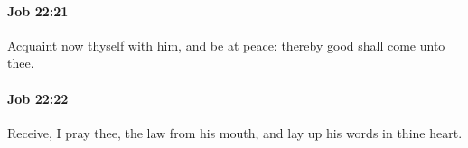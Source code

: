 		\paragraph{Job 22:21} %
			\label{JOB-22-21}

			Acquaint now thyself with him, and be at peace: thereby good shall come unto thee.


		\paragraph{Job 22:22} %
			\label{JOB-22-22}

			Receive, I pray thee, the law from his mouth, and lay up his words in thine heart.


